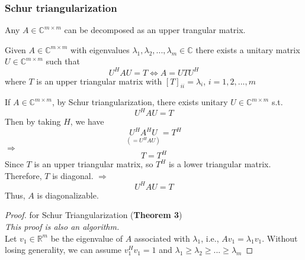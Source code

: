 \begin{multicols}{2}
\subsubsection{Schur triangularization}
Any $A\in\mathbb{C}^{m\times m}$ can be decomposed as an upper trangular matrix.
\begin{theorem} 
    Given $A\in\mathbb{C}^{m\times m}$ with eigenvalues $\lambda_1,\lambda_2,...,\lambda_m\in\mathbb{C}$ there 
    exists a unitary matrix $U\in\mathbb{C}^{m\times m}$ such that 
    \[
        U^HAU = T \Longleftrightarrow A=UTU^H
    \]
    where $T$ is an upper triangular matrix with $[T]_{ii}=\lambda_i$, $i=1,2,...,m$
\end{theorem}
If $A\in\mathbb{C}^{m\times m}$, by Schur triangularization, there exists unitary $U\in\mathbb{C}^{m\times m}$ s.t. 
\[
    U^HAU = T 
\]
Then by taking $H$, we have
\[
    \underset{(=U^HAU)}{U^HA^HU}=T^H
\]
$\Longrightarrow$
\[
    T=T^H
\]
Since $T$ is an upper triangular matrix, so $T^H$ is a lower triangular matrix. Therefore, $T$ is diagonal.
$\Longrightarrow$
\[
    U^HAU = T
\]
Thus, $A$ is diagonalizable.

\begin{proof} for Schur Triangularization (\textbf{Theorem 3}) \\
    \emph{This proof is also an algorithm.} \\
    Let $v_1\in\mathbb{R}^m$ be the eigenvalue of $A$ associated with $\lambda_1$, i.e., $Av_1=\lambda_1v_1$. 
    Without losing generality, we can assume $v_1^Hv_1=1$ and $\lambda_1\geq \lambda_2\geq ... \geq \lambda_m$


\end{proof}
\end{multicols}
